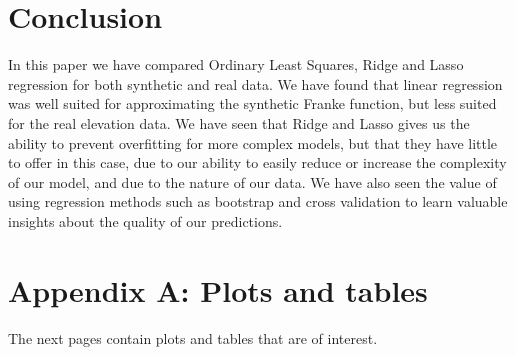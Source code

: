 \documentclass[twocolumn,10pt,cleanfoot]{asme2ej}
\begin{document}
\section{Conclusion}

In this paper we have compared Ordinary Least Squares, Ridge and Lasso regression for both synthetic and real data. We have found that linear regression was well suited for approximating the synthetic Franke function, but less suited for the real elevation data. We have seen that Ridge and Lasso gives us the ability to prevent overfitting for more complex models, but that they have little to offer in this case, due to our ability to easily reduce or increase the complexity of our model, and due to the nature of our data. We have also seen the value of using regression methods such as bootstrap and cross validation to learn valuable insights about the quality of our predictions.




\appendix       %
\section*{Appendix A: Plots and tables}

The next pages contain plots and tables that are of interest.
\end{document}
